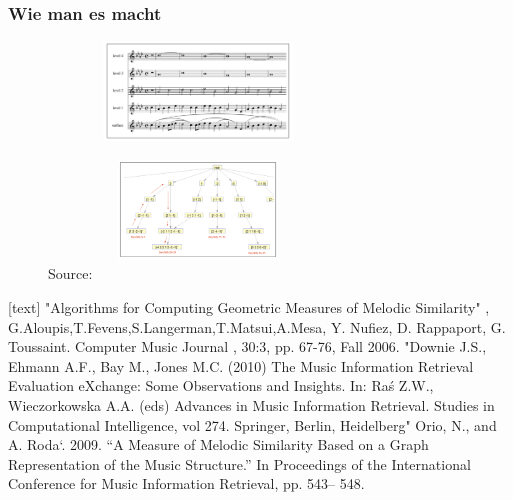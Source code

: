 \documentclass{beamer}
\begin{document}
	\begin{frame}
		\frametitle{Wie man es macht}
		\begin{figure}[h!]
					\includegraphics[width=300px,height=100px,keepaspectratio]{one_of_two_point_four}
		\end{figure}
		\begin{figure}[h!]
					\includegraphics[width=300px,height=100px,keepaspectratio]{two_of_two_point_four}
					\caption{Source: \cite{two_point_four}}

		\end{figure}
	\end{frame}


	\begin{frame}
		\begin{thebibliography}{9}
			[text]
			 "Algorithms for Computing Geometric Measures of  Melodic Similarity" , G.Aloupis,T.Fevens,S.Langerman,T.Matsui,A.Mesa, Y. Nufiez, D. Rappaport, G. Toussaint. Computer Music Journal , 30:3, pp. 67-76, Fall 2006.
			 "Downie J.S., Ehmann A.F., Bay M., Jones M.C. (2010) The Music Information Retrieval Evaluation eXchange: Some Observations and Insights. In: Raś Z.W., Wieczorkowska A.A. (eds) Advances in Music Information Retrieval. Studies in Computational Intelligence, vol 274. Springer, Berlin, Heidelberg"
			 Orio, N., and A. Roda`. 2009. “A Measure of Melodic Similarity Based on a Graph Representation of the Music Structure.” In Proceedings of the International Conference for Music Information Retrieval, pp. 543– 548.
		\end{thebibliography}
	\end{frame}
\end{document}
